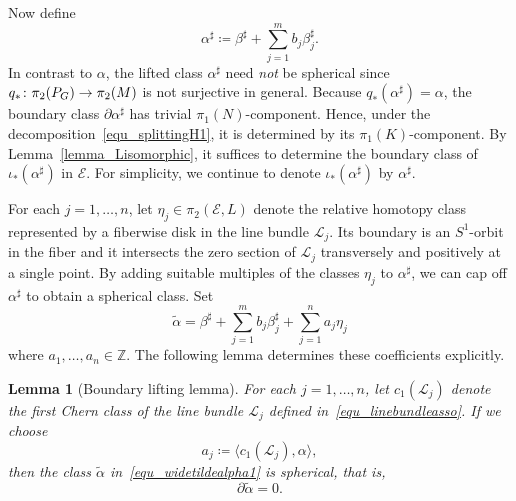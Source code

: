 \documentclass[11pt]{amsart}
\theoremstyle{plain}
\newtheorem{lemma}[theorem]{Lemma}
\theoremstyle{definition}
\theoremstyle{remark}
\newcommand{\Z}{\mathbb{Z}}
\numberwithin{equation}{section} \numberwithin{table}{section}
\def\to{\mathchoice{\longrightarrow}{\rightarrow}{\rightarrow}{\rightarrow}}
\numberwithin{equation}{section}
\begin{document}
Now define
\begin{equation}\label{equ_alphasharp}
\alpha^\sharp \coloneqq \beta^\sharp + \sum_{j=1}^m b_j \beta^\sharp_j.
\end{equation}
In contrast to $\alpha$, the lifted class $\alpha^\sharp$ need \emph{not} be spherical since $q_* \colon \pi_2(P_G) \to \pi_2(M)$ is not surjective in general. Because $q_* (\alpha^\sharp) = \alpha$, the boundary class $\partial \alpha^\sharp$ has trivial $\pi_1(N)$-component. Hence, under the decomposition~\eqref{equ_splittingH1}, it is determined by its $\pi_1(K)$-component. By Lemma~\ref{lemma_Lisomorphic}, it suffices to determine the boundary class of $\iota_*(\alpha^\sharp)$ in $\mathcal{E}$. For simplicity, we continue to denote $\iota_*(\alpha^\sharp)$ by $\alpha^\sharp$.

For each $j = 1, \dots, n$, let $\eta_j \in \pi_2(\mathcal{E},L)$ denote the relative homotopy class represented by a fiberwise disk in the line bundle $\mathcal{L}_j$. Its boundary is an $S^1$-orbit in the fiber and it intersects the zero section of $\mathcal{L}_j$ transversely and positively at a single point. By adding suitable multiples of the classes $\eta_j$ to $\alpha^\sharp$, we can cap off $\alpha^\sharp$ to obtain a spherical class. Set
\begin{equation}\label{equ_widetildealpha1}
\widetilde{\alpha} = \beta^\sharp + \sum_{j=1}^m b_j \beta_j^\sharp + \sum_{j=1}^n a_j \eta_j
\end{equation}
where $a_1, \dots ,a_n \in \Z$. The following lemma determines these coefficients explicitly.

\begin{lemma}[Boundary lifting lemma]\label{lemma_boundaryliftinglemma}
For each $j = 1, \dots, n$, let $c_1(\mathcal{L}_j)$ denote the first Chern class of the line bundle $\mathcal{L}_j$ defined in~\eqref{equ_linebundleasso}. If we choose
$$
a_j \coloneqq \langle c_1(\mathcal{L}_j), \alpha \rangle,
$$
then the class $\widetilde{\alpha}$ in~\eqref{equ_widetildealpha1} is spherical, that is, 
\begin{equation}\label{equ_widetildealpha}
\partial \widetilde{\alpha} = 0.
\end{equation}
\end{lemma}
\end{document}
